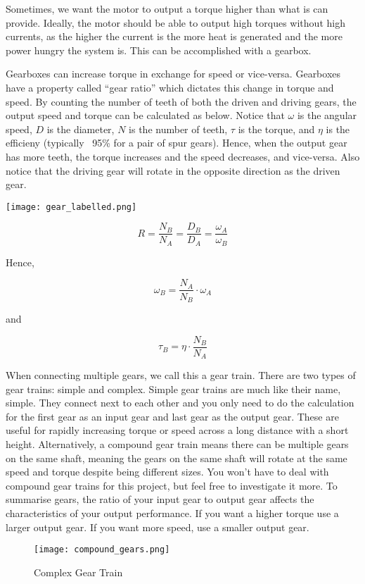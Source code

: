 \documentclass[../TinyBot.tex]{subfiles}
\begin{document}
\begin{minipage}[t]{0.6\textwidth}\vspace{0pt}

    Sometimes, we want the motor to output a torque higher than what is can provide.
    Ideally, the motor should be able to output high torques without high currents,
    as the higher the current is the more heat is generated and the more power
    hungry the system is. This can be accomplished with a gearbox.

    Gearboxes can increase torque in exchange for speed or vice-versa. Gearboxes have
    a property called ``gear ratio'' which dictates this change in torque and speed.
    By counting the number of teeth of both the driven and driving gears, the output
    speed and torque can be calculated as below. Notice that $\omega$ is the angular
    speed, $D$ is the diameter, $N$ is the number of teeth, $\tau$ is the torque, and
    $\eta$ is the efficieny (typically ~95\% for a pair of spur gears). Hence, when
    the output gear has more teeth, the torque increases and the speed decreases,
    and vice-versa. Also notice that the driving gear will rotate in the opposite
    direction as the driven gear. \\

\end{minipage}
\begin{minipage}[t]{0.4\textwidth}\vspace{0pt}
    \begin{center}
        \texttt{[image: gear\_labelled.png]}
        \label{fig:gear-driver-driven}
    \end{center}
\end{minipage}


\[ R = \frac{N_B}{N_A} = \frac{D_B}{D_A} = \frac{\omega_A}{\omega_B} \]

Hence,

\[ \omega_B = \frac{N_A}{N_B} \cdot \omega_A \]

and

\[ \tau_B = \eta \cdot \frac{N_B}{N_A} \]

When connecting multiple gears, we call this a gear train. There are two types of gear trains:
simple and complex. Simple gear trains are much like their name, simple. They connect next to
each other and you only need to do the calculation for the first gear as an input gear and last
gear as the output gear. These are useful for rapidly increasing torque or speed across a long
distance with a short height. Alternatively, a compound gear train means there can be multiple
gears on the same shaft, meaning the gears on the same shaft will rotate at the same speed and
torque despite being different sizes. You won’t have to deal with compound gear trains for this
project, but feel free to investigate it more. To summarise gears, the ratio of your input gear
to output gear affects the characteristics of your output performance. If you want a higher
torque use a larger output gear. If you want more speed, use a smaller output gear.

\begin{figure}[h]
    \centering
    \texttt{[image: compound\_gears.png]}
    \label{fig:gear-complex}
    \caption{Complex Gear Train}
\end{figure}
\end{document}
